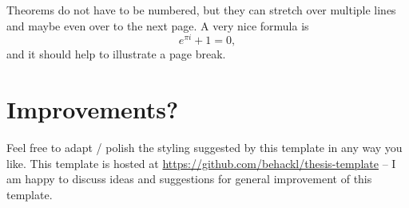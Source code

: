 \documentclass[11pt, twoside, bachelor]{bhthesis}
\begin{document}
\begin{theorem*}
  Theorems do not have to be numbered, but they can stretch over
  multiple lines and maybe even over to the next page. A very nice
  formula is
  \[ e^{\pi i} + 1 = 0, \]
  and it should help to illustrate a page break.
\end{theorem*}

\section{Improvements?}

Feel free to adapt / polish the styling suggested by this template
in any way you like. This template is hosted at
\url{https://github.com/behackl/thesis-template} -- I am happy to
discuss ideas and suggestions for general improvement of this template.
\end{document}
